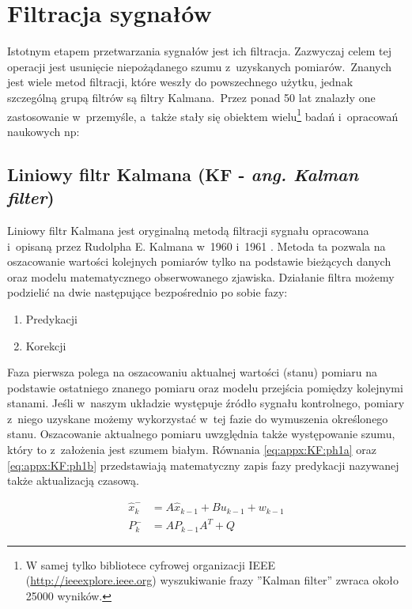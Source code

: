 \chapter{Filtracja sygnałów}
\label{chap:appx:filters}
Istotnym etapem przetwarzania sygnałów jest ich filtracja. Zazwyczaj celem tej operacji jest usunięcie niepożądanego szumu z~uzyskanych pomiarów.~Znanych jest wiele metod filtracji, które weszły do powszechnego użytku, jednak szczególną grupą filtrów są filtry Kalmana.~Przez ponad 50 lat znalazły one zastosowanie w~przemyśle, a~także stały się obiektem wielu\footnote{W samej tylko bibliotece cyfrowej organizacji IEEE (\url{http://ieeexplore.ieee.org}) wyszukiwanie frazy ''Kalman filter'' zwraca około 25000 wyników.} badań i~opracowań naukowych np:  \cite{Droleta,Welch2006, Kedzierski2007, Huo2014, Pandey2014}

\section*{Liniowy filtr Kalmana (KF - \emph{ang. Kalman filter})}
\label{sec:appx:filters:KF}
Liniowy filtr Kalmana jest oryginalną metodą filtracji sygnału opracowana i~opisaną przez Rudolpha E. Kalmana w~1960 \cite{Kalman1960} i~1961 \cite{KalmanBucy1961}. Metoda ta pozwala na oszacowanie wartości kolejnych pomiarów tylko na podstawie bieżących danych oraz modelu matematycznego obserwowanego zjawiska. Działanie filtra możemy podzielić na dwie następujące bezpośrednio po sobie fazy: 
\begin{enumerate}
	\item Predykacji
	\item Korekcji
\end{enumerate}

Faza pierwsza polega na oszacowaniu aktualnej wartości (stanu) pomiaru na podstawie ostatniego znanego pomiaru oraz modelu przejścia pomiędzy kolejnymi stanami. Jeśli w~naszym układzie występuje źródło sygnału kontrolnego, pomiary z~niego uzyskane możemy wykorzystać w~tej fazie do wymuszenia określonego stanu. Oszacowanie aktualnego pomiaru uwzględnia także występowanie szumu, który to z~założenia jest szumem białym. Równania \eqref{eq:appx:KF:ph1a} oraz \eqref{eq:appx:KF:ph1b} przedstawiają matematyczny zapis fazy predykacji nazywanej także aktualizacją czasową.

\begin{subequations}
	\begin{align}
		\widehat{x}^-_k & = A\widehat{x}_{k-1} + Bu_{k-1} + w_{k-1}\label{eq:appx:KF:ph1a} \\
		P^-_k           & = AP_{k-1}A^T + Q \label{eq:appx:KF:ph1b}                        
	\end{align}
\end{subequations}


